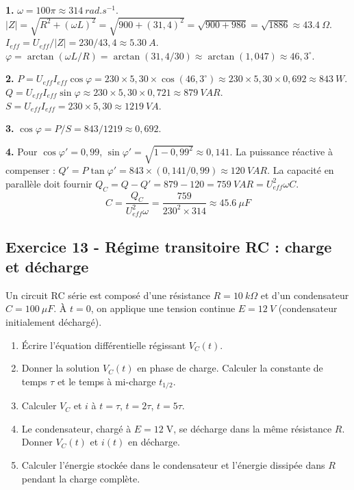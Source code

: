 \documentclass[12pt,a4paper]{article}
\begin{document}
\begin{boitecorrige}
\textbf{1.} $\omega = 100\pi \approx \qty{314}{rad.s^{-1}}$.
$|Z| = \sqrt{R^2+(\omega L)^2} = \sqrt{900+(31{,}4)^2} = \sqrt{900+986} = \sqrt{1886} \approx \qty{43.4}{\Omega}$.
$I_{eff} = U_{eff}/|Z| = 230/43{,}4 \approx \qty{5.30}{A}$.
$\varphi = \arctan(\omega L/R) = \arctan(31{,}4/30) \approx \arctan(1{,}047) \approx 46{,}3^\circ $.

\textbf{2.} $P = U_{eff}I_{eff}\cos\varphi = 230\times5{,}30\times\cos(46{,}3^\circ ) \approx 230\times5{,}30\times0{,}692 \approx \qty{843}{W}$.
$Q = U_{eff}I_{eff}\sin\varphi \approx 230\times5{,}30\times0{,}721 \approx \qty{879}{VAR}$.
$S = U_{eff}I_{eff} = 230\times5{,}30 \approx \qty{1219}{VA}$.

\textbf{3.} $\cos\varphi = P/S = 843/1219 \approx 0{,}692$.

\textbf{4.} Pour $\cos\varphi'=0{,}99$, $\sin\varphi'=\sqrt{1-0{,}99^2}\approx0{,}141$. La puissance réactive à compenser :
$Q' = P\tan\varphi'= 843\times(0{,}141/0{,}99)\approx \qty{120}{VAR}$.
La capacité en parallèle doit fournir $Q_C = Q-Q' = 879-120 = \qty{759}{VAR} = U_{eff}^2\omega C$.
\[
C = \frac{Q_C}{U_{eff}^2\omega} = \frac{759}{230^2\times314} \approx \qty{45.6}{\mu F}
\]
\end{boitecorrige}


\subsection*{Exercice 13 - Régime transitoire RC : charge et décharge \niveau{\moyen}}

\begin{boiteexercice}
Un circuit RC série est composé d'une résistance $R=\qty{10}{k\Omega}$ et d'un condensateur $C=\qty{100}{\mu F}$. À $t=0$, on applique une tension continue $E=\qty{12}{V}$ (condensateur initialement déchargé).
\begin{enumerate}
  \item Écrire l'équation différentielle régissant $V_C(t)$.
  \item Donner la solution $V_C(t)$ en phase de charge. Calculer la constante de temps $\tau$ et le temps à mi-charge $t_{1/2}$.
  \item Calculer $V_C$ et $i$ à $t=\tau$, $t=2\tau$, $t=5\tau$.
  \item Le condensateur, chargé à $E=12\;\text{V}$, se décharge dans la même résistance $R$. Donner $V_C(t)$ et $i(t)$ en décharge.
  \item Calculer l'énergie stockée dans le condensateur et l'énergie dissipée dans $R$ pendant la charge complète.
\end{enumerate}
\end{boiteexercice}
\end{document}
